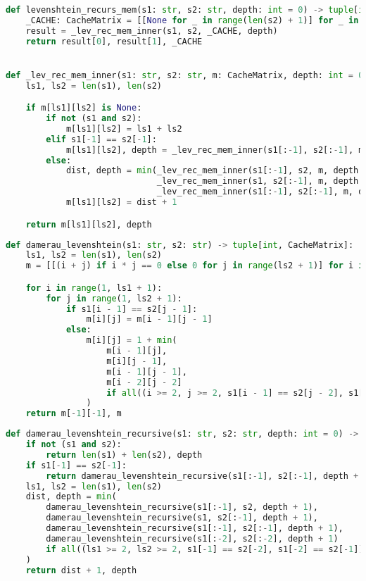 \begin{lstlisting}[label=LevRecMem,caption=Функция нахождения расстояние Левенштейна рекурсивно с матрицей в качестве кэша,language=python]
def levenshtein_recurs_mem(s1: str, s2: str, depth: int = 0) -> tuple[int, int, CacheMatrix]:
    _CACHE: CacheMatrix = [[None for _ in range(len(s2) + 1)] for _ in range(len(s1) + 1)]
    result = _lev_rec_mem_inner(s1, s2, _CACHE, depth)
    return result[0], result[1], _CACHE


def _lev_rec_mem_inner(s1: str, s2: str, m: CacheMatrix, depth: int = 0) -> tuple[int, int]:
    ls1, ls2 = len(s1), len(s2)

    if m[ls1][ls2] is None:
        if not (s1 and s2):
            m[ls1][ls2] = ls1 + ls2
        elif s1[-1] == s2[-1]:
            m[ls1][ls2], depth = _lev_rec_mem_inner(s1[:-1], s2[:-1], m, depth + 1)
        else:
            dist, depth = min(_lev_rec_mem_inner(s1[:-1], s2, m, depth + 1),
                              _lev_rec_mem_inner(s1, s2[:-1], m, depth + 1),
                              _lev_rec_mem_inner(s1[:-1], s2[:-1], m, depth + 1))
            m[ls1][ls2] = dist + 1

    return m[ls1][ls2], depth
\end{lstlisting}


\begin{lstlisting}[label=DamLev,caption=Функция нахождения расстояния Дамерау-Левенштейна матрично,language=python]
def damerau_levenshtein(s1: str, s2: str) -> tuple[int, CacheMatrix]:
    ls1, ls2 = len(s1), len(s2)
    m = [[(i + j) if i * j == 0 else 0 for j in range(ls2 + 1)] for i in range(ls1 + 1)]

    for i in range(1, ls1 + 1):
        for j in range(1, ls2 + 1):
            if s1[i - 1] == s2[j - 1]:
                m[i][j] = m[i - 1][j - 1]
            else:
                m[i][j] = 1 + min(
                    m[i - 1][j],
                    m[i][j - 1],
                    m[i - 1][j - 1],
                    m[i - 2][j - 2]
                    if all((i >= 2, j >= 2, s1[i - 1] == s2[j - 2], s1[i - 2] == s2[j - 1])) else inf
                )
    return m[-1][-1], m
\end{lstlisting}


\begin{lstlisting}[label=DamLevRec,caption=Функция нахождения расстояния Дамерау-Левенштейна рекурсивно,language=python]
def damerau_levenshtein_recursive(s1: str, s2: str, depth: int = 0) -> tuple[int, int]:
    if not (s1 and s2):
        return len(s1) + len(s2), depth
    if s1[-1] == s2[-1]:
        return damerau_levenshtein_recursive(s1[:-1], s2[:-1], depth + 1)
    ls1, ls2 = len(s1), len(s2)
    dist, depth = min(
        damerau_levenshtein_recursive(s1[:-1], s2, depth + 1),
        damerau_levenshtein_recursive(s1, s2[:-1], depth + 1),
        damerau_levenshtein_recursive(s1[:-1], s2[:-1], depth + 1),
        damerau_levenshtein_recursive(s1[:-2], s2[:-2], depth + 1)
        if all((ls1 >= 2, ls2 >= 2, s1[-1] == s2[-2], s1[-2] == s2[-1])) else inf,
    )
    return dist + 1, depth
\end{lstlisting}

